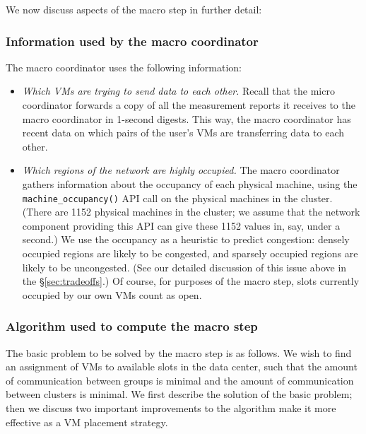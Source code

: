 \documentclass[11pt]{article}
\begin{document}
We now discuss aspects of the macro step in further detail:

\subsubsection{Information used by the macro coordinator}

The macro coordinator uses the following information:

\begin{itemize}
  \item {\em Which VMs are trying to send data to each other.}  Recall that the micro coordinator forwards a copy of all the measurement reports it receives to the macro coordinator in 1-second digests.  This way, the macro coordinator has recent data on which pairs of the user's VMs are transferring data to each other.
    
  \item {\em Which regions of the network are highly occupied.}  The macro coordinator gathers information about the occupancy of each physical machine, using the \texttt{machine\_occupancy()} API call on the physical machines in the cluster.  (There are 1152 physical machines in the cluster; we assume that the network component providing this API can give these 1152 values in, say, under a second.)   We use the occupancy as a heuristic to predict congestion: densely occupied regions are likely to be congested, and sparsely occupied regions are likely to be uncongested.  (See our detailed discussion of this issue above in the \S\ref{sec:tradeoffs}.)  Of course, for purposes of the macro step, slots currently occupied by our own VMs count as open.
\end{itemize}


\subsubsection{Algorithm used to compute the macro step}

The basic problem to be solved by the macro step is as follows.  We wish to find an assignment of VMs to available slots in the data center, such that the amount of communication between groups is minimal and the amount of communication between clusters is minimal.  We first describe the solution of the basic problem; then we discuss two important improvements to the algorithm make it more effective as a VM placement strategy.
\end{document}
